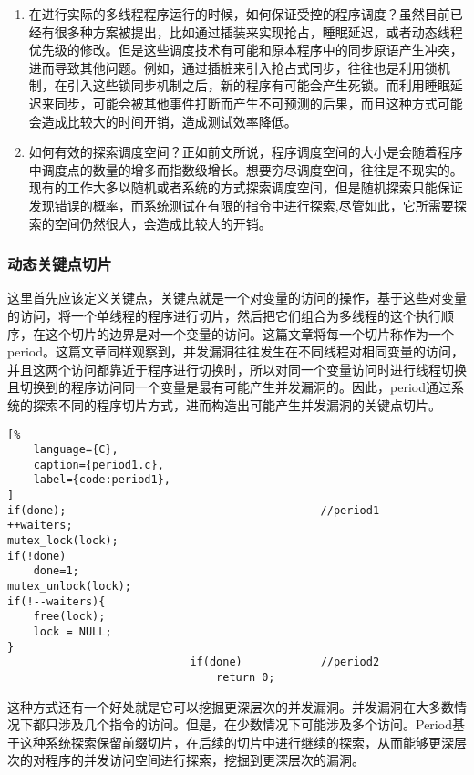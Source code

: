 \begin{enumerate}
\item 在进行实际的多线程程序运行的时候，如何保证受控的程序调度？虽然目前已经有很多种方案被提出，比如通过插装来实现抢占，睡眠延迟，或者动态线程优先级的修改。但是这些调度技术有可能和原本程序中的同步原语产生冲突，进而导致其他问题。例如，通过插桩来引入抢占式同步，往往也是利用锁机制，在引入这些锁同步机制之后，新的程序有可能会产生死锁。而利用睡眠延迟来同步，可能会被其他事件打断而产生不可预测的后果，而且这种方式可能会造成比较大的时间开销，造成测试效率降低。
\item 如何有效的探索调度空间？正如前文所说，程序调度空间的大小是会随着程序中调度点的数量的增多而指数级增长。想要穷尽调度空间，往往是不现实的。现有的工作大多以随机或者系统的方式探索调度空间，但是随机探索只能保证发现错误的概率，而系统测试在有限的指令中进行探索,尽管如此，它所需要探索的空间仍然很大，会造成比较大的开销。
\end{enumerate}

\subsubsection{动态关键点切片}

这里首先应该定义关键点，关键点就是一个对变量的访问的操作，基于这些对变量的访问，将一个单线程的程序进行切片，然后把它们组合为多线程的这个执行顺序，在这个切片的边界是对一个变量的访问。这篇文章将每一个切片称作为一个period。这篇文章同样观察到，并发漏洞往往发生在不同线程对相同变量的访问，并且这两个访问都靠近于程序进行切换时，所以对同一个变量访问时进行线程切换且切换到的程序访问同一个变量是最有可能产生并发漏洞的。因此，period通过系统的探索不同的程序切片方式，进而构造出可能产生并发漏洞的关键点切片。

\begin{lstlisting}[%
    language={C},
    caption={period1.c},
    label={code:period1},
]
if(done);                                       //period1
++waiters;
mutex_lock(lock); 
if(!done) 
    done=1; 
mutex_unlock(lock); 
if(!--waiters){ 
    free(lock); 
    lock = NULL; 
} 
                            if(done)            //period2
                                return 0;
\end{lstlisting}

这种方式还有一个好处就是它可以挖掘更深层次的并发漏洞。并发漏洞在大多数情况下都只涉及几个指令的访问。但是，在少数情况下可能涉及多个访问。Period基于这种系统探索保留前缀切片，在后续的切片中进行继续的探索，从而能够更深层次的对程序的并发访问空间进行探索，挖掘到更深层次的漏洞。

